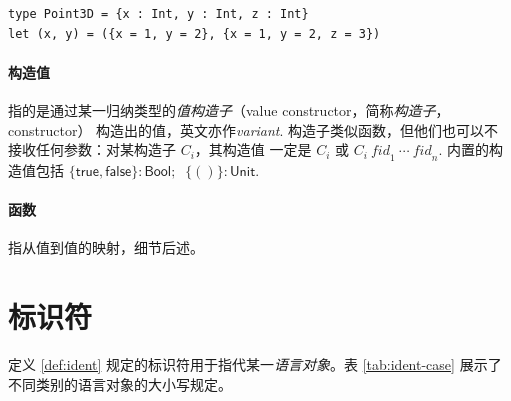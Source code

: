 \begin{verbatim}
type Point3D = {x : Int, y : Int, z : Int}
let (x, y) = ({x = 1, y = 2}, {x = 1, y = 2, z = 3})
\end{verbatim}
{\setlength{\parskip}{-1em}
  \paragraph*{构造值} 指的是通过某一归纳类型的\emph{值构造子}（value constructor，简称\emph{构造子}，constructor）
  构造出的值，英文亦作\emph{variant}. 构造子类似函数，但他们也可以不接收任何参数：对某构造子 $C_i$，其构造值
  一定是 $C_i$ 或 $C_i\ \textit{fid}_1\ \cdots\ \textit{fid}_n$. 内置的构造值包括
  $
  \{\mathsf{true}, \mathsf{false}\} : \mathsf{Bool};\;\;\{\mathsf{()}\} : \mathsf{Unit}
  $.
  \paragraph*{函数} 指从值到值的映射，细节后述。
}
\section{标识符}
定义 \ref{def:ident} 规定的标识符用于指代某一\emph{语言对象}。表 \ref{tab:ident-case} 展示了
不同类别的语言对象的大小写规定。


